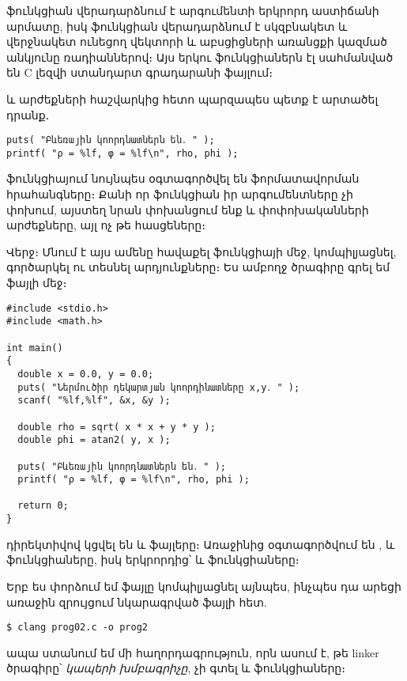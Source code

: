  ֆունկցիան վերադարձնում է արգումենտի երկրորդ աստիճանի
արմատը, իսկ  ֆունկցիան վերադարձնում է  սկզբնակետ
և  վերջնակետ ունեցող վեկտորի և աբսցիցների առանցքի կազմած
անկյունը ռադիաններով։ Այս երկու ֆունկցիաներն էլ սահմանված են C լեզվի
ստանդարտ գրադարանի  ֆայլում։

 և  արժեքների հաշվարկից հետո պարզապես պետք է
արտածել դրանք․

\begin{verbatim}
puts( "Բևեռային կոորդնատներն են․ " );
printf( "ρ = %lf, φ = %lf\n", rho, phi );
\end{verbatim}

 ֆունկցիայում նույնպես օգտագործվել են 
ֆորմատավորման հրահանգները։ Քանի որ  ֆունկցիան իր
արգումենտները չի փոխում, այստեղ նրան փոխանցում ենք  և
 փոփոխականների արժեքները, այլ ոչ թե հասցեները։

Վերջ։ Մնում է այս ամենը հավաքել  ֆունկցիայի մեջ,
կոմպիլյացնել, գործարկել ու տեսնել արդյունքները։ Ես ամբողջ ծրագիրը գրել
եմ  ֆայլի մեջ։

\begin{verbatim}
#include <stdio.h>
#include <math.h>

int main()
{
  double x = 0.0, y = 0.0;
  puts( "Ներմուծիր դեկարտյան կոորդինատները x,y․ " );
  scanf( "%lf,%lf", &x, &y );

  double rho = sqrt( x * x + y * y );
  double phi = atan2( y, x );

  puts( "Բևեռային կոորդնատներն են․ " );
  printf( "ρ = %lf, φ = %lf\n", rho, phi );

  return 0;
}
\end{verbatim}

 դիրեկտիվով կցվել են  և
 ֆայլերը։ Առաջինից օգտագործվում են ,
 և  ֆունկցիաները, իսկ երկրորդից՝
 և  ֆունկցիաները։

Երբ ես փորձում եմ  ֆայլը կոմպիլյացնել այնպես, ինչպես դա
արեցի առաջին զրույցում նկարագրված  ֆայլի հետ.

\begin{verbatim}
$ clang prog02.c -o prog2
\end{verbatim}

ապա ստանում եմ մի հաղորդագրություն, որն ասում է, թե linker ծրագիրը՝
\emph{կապերի խմբագրիչը}, չի գտել  և 
ֆունկցիաները։

